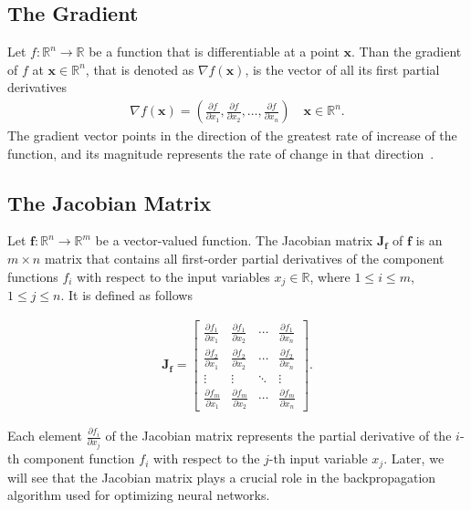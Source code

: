 \subsection{The Gradient}
\label{sec:gradient}

Let \( f: \mathbb{R}^n \to \mathbb{R} \) be a function  that is differentiable at a point $ \mathbf{x} $.
Than the gradient of $ f $ at $ \mathbf{x} \in \mathbb{R}^n$, that is denoted as $ \nabla f(\mathbf{x}) $, is the vector of all its first partial derivatives
\begin{align}
\nabla f(\mathbf{x}) = \left( \frac{\partial f}{\partial x_1}, \frac{\partial f}{\partial x_2}, \ldots, \frac{\partial f}{\partial x_n} \right) \quad \mathbf{x} \in \mathbb{R}^n.
\end{align}
The gradient vector points in the direction of the greatest rate of increase of the function, and its magnitude represents the rate of change in that direction~\cite{bachman2007}.


\subsection{The Jacobian Matrix}
\label{sec:jaocobian}

Let $ \mathbf{f}: \mathbb{R}^n \to \mathbb{R}^m $ be a vector-valued function.
The Jacobian matrix \( \mathbf{J_f} \) of \( \mathbf{f} \) is an \( m \times n \) matrix that contains all first-order partial derivatives of the component functions \( f_i \) with respect to the input variables \( x_j  \in \mathbb{R} \), where $1 \leq i \leq m$, $1 \leq j \leq n$. It is defined as follows

\begin{align}
\mathbf{J_f} = \begin{bmatrix}
\frac{\partial f_1}{\partial x_1} & \frac{\partial f_1}{\partial x_2} & \cdots & \frac{\partial f_1}{\partial x_n} \\
\frac{\partial f_2}{\partial x_1} & \frac{\partial f_2}{\partial x_2} & \cdots & \frac{\partial f_2}{\partial x_n} \\
\vdots & \vdots & \ddots & \vdots \\
\frac{\partial f_m}{\partial x_1} & \frac{\partial f_m}{\partial x_2} & \cdots & \frac{\partial f_m}{\partial x_n}
\end{bmatrix}.
\end{align}


Each element \( \frac{\partial f_i}{\partial x_j} \) of the Jacobian matrix represents the partial derivative of the \( i \)-th component function \( f_i \) with respect to the \( j \)-th input variable \( x_j \).
Later, we will see that the Jacobian matrix plays a crucial role in the backpropagation algorithm used for optimizing neural networks.
